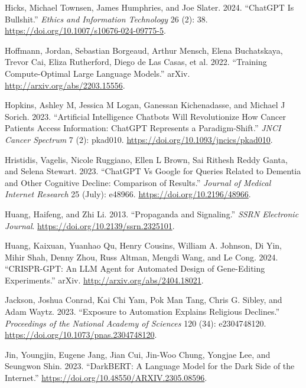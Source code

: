 \documentclass[
  Letterpaper,
]{scrbook}
\newlength{\cslhangindent}
\newenvironment{CSLReferences}[2] %
 {\begin{list}{}{%
  \setlength{\itemindent}{0pt}
  \setlength{\leftmargin}{0pt}
  \setlength{\parsep}{0pt}
  \ifodd #1
   \setlength{\leftmargin}{\cslhangindent}
   \setlength{\itemindent}{-1\cslhangindent}
  \fi
  \setlength{\itemsep}{#2\baselineskip}}}
 {\end{list}}
\begin{document}
\begin{CSLReferences}{1}{0}
Hicks, Michael Townsen, James Humphries, and Joe Slater. 2024.
{``{ChatGPT} Is Bullshit.''} \emph{Ethics and Information Technology} 26
(2): 38. \url{https://doi.org/10.1007/s10676-024-09775-5}.

Hoffmann, Jordan, Sebastian Borgeaud, Arthur Mensch, Elena Buchatskaya,
Trevor Cai, Eliza Rutherford, Diego de Las Casas, et al. 2022.
{``Training {Compute}-{Optimal} {Large} {Language} {Models}.''} arXiv.
\url{http://arxiv.org/abs/2203.15556}.

Hopkins, Ashley M, Jessica M Logan, Ganessan Kichenadasse, and Michael J
Sorich. 2023. {``Artificial Intelligence Chatbots Will Revolutionize How
Cancer Patients Access Information: {ChatGPT} Represents a
Paradigm-Shift.''} \emph{JNCI Cancer Spectrum} 7 (2): pkad010.
\url{https://doi.org/10.1093/jncics/pkad010}.

Hristidis, Vagelis, Nicole Ruggiano, Ellen L Brown, Sai Rithesh Reddy
Ganta, and Selena Stewart. 2023. {``{ChatGPT} Vs {Google} for {Queries}
{Related} to {Dementia} and {Other} {Cognitive} {Decline}: {Comparison}
of {Results}.''} \emph{Journal of Medical Internet Research} 25 (July):
e48966. \url{https://doi.org/10.2196/48966}.

Huang, Haifeng, and Zhi Li. 2013. {``Propaganda and {Signaling}.''}
\emph{SSRN Electronic Journal}.
\url{https://doi.org/10.2139/ssrn.2325101}.

Huang, Kaixuan, Yuanhao Qu, Henry Cousins, William A. Johnson, Di Yin,
Mihir Shah, Denny Zhou, Russ Altman, Mengdi Wang, and Le Cong. 2024.
{``{CRISPR}-{GPT}: {An} {LLM} {Agent} for {Automated} {Design} of
{Gene}-{Editing} {Experiments}.''} arXiv.
\url{http://arxiv.org/abs/2404.18021}.

Jackson, Joshua Conrad, Kai Chi Yam, Pok Man Tang, Chris G. Sibley, and
Adam Waytz. 2023. {``Exposure to Automation Explains Religious
Declines.''} \emph{Proceedings of the National Academy of Sciences} 120
(34): e2304748120. \url{https://doi.org/10.1073/pnas.2304748120}.

Jin, Youngjin, Eugene Jang, Jian Cui, Jin-Woo Chung, Yongjae Lee, and
Seungwon Shin. 2023. {``{DarkBERT}: {A} {Language} {Model} for the
{Dark} {Side} of the {Internet}.''}
\url{https://doi.org/10.48550/ARXIV.2305.08596}.


\end{CSLReferences}
\end{document}
